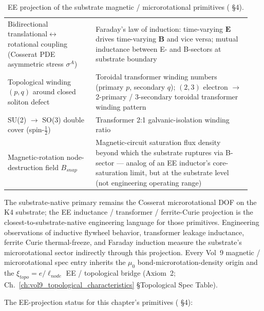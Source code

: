 \begin{table}[htbp]
\begin{tabular}{p{0.34\linewidth} p{0.60\linewidth}}
Bidirectional translational$\leftrightarrow$rotational coupling (Cosserat PDE asymmetric stress $\sigma^A$) & Faraday's law of induction: time-varying $\mathbf{E}$ drives time-varying $\mathbf{B}$ and vice versa; mutual inductance between E- and B-sectors at substrate boundary \\
Topological winding $(p, q)$ around closed soliton defect & Toroidal transformer winding numbers (primary $p$, secondary $q$); $(2, 3)$ electron $\to$ 2-primary / 3-secondary toroidal transformer winding pattern \\
SU(2) $\to$ SO(3) double cover (spin-$\tfrac{1}{2}$) & Transformer 2:1 galvanic-isolation winding ratio \\
Magnetic-rotation node-destruction field $B_{snap}$ & Magnetic-circuit saturation flux density beyond which the substrate ruptures via B-sector --- analog of an EE inductor's core-saturation limit, but at the substrate level (not engineering operating range) \\
\bottomrule
\end{tabular}
\renewcommand{\arraystretch}{1.0}
\caption{EE projection of the substrate magnetic / microrotational primitives ( \S 4).}
\label{tab:vol9_magnetic_ee_translation}
\end{table}

The substrate-native primary remains the Cosserat microrotational DOF on the K4 substrate; the EE inductance / transformer / ferrite-Curie projection is the closest-to-substrate-native engineering language for those primitives. Engineering observations of inductive flywheel behavior, transformer leakage inductance, ferrite Curie thermal-freeze, and Faraday induction measure the substrate's microrotational sector indirectly through this projection. Every Vol~9 magnetic / microrotational spec entry inherits the $\mu_0$ bond-microrotation-density origin and the $\xi_{topo} = e/\ell_{node}$ EE / topological bridge (Axiom~2; Ch.~\ref{ch:vol9_topological_characteristics} \S Topological Spec Table).

The EE-projection status for this chapter's primitives ( \S 4):

